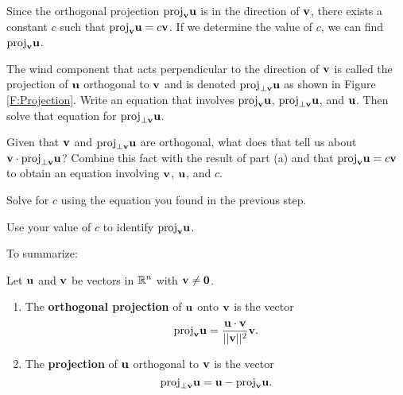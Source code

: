 \begin{activity} Since the orthogonal projection $\text{proj}_{\mathbf{v}} \mathbf{u}$ is in the direction of $\mathbf{v}$, there exists a constant $c$ such that $\text{proj}_{\mathbf{v}} \mathbf{u} = c \mathbf{v}$. If we determine the value of  $c$, we can find $\text{proj}_{\mathbf{v}} \mathbf{u}$.
\ba 
\item The wind component that acts perpendicular to the direction of $\mathbf{v}$ is called the projection of $\mathbf{u}$ orthogonal to $\mathbf{v}$ and is denoted $\text{proj}_{\perp \mathbf{v}} \mathbf{u}$ as shown in Figure \ref{F:Projection}. Write an equation that involves $\text{proj}_{\mathbf{v}} \mathbf{u}$, $\text{proj}_{\perp \mathbf{v}} \mathbf{u}$, and $\mathbf{u}$. Then solve that equation for $\text{proj}_{\perp \mathbf{v}} \mathbf{u}$. 

\item Given that $\mathbf{v}$ and $\text{proj}_{\perp \mathbf{v}} \mathbf{u}$ are orthogonal, what does that tell us about $\mathbf{v} \cdot \text{proj}_{\perp \mathbf{v}} \mathbf{u}$? Combine this fact with the result of part (a) and that $\text{proj}_{\mathbf{v}} \mathbf{u} = c \mathbf{v}$ to obtain an equation involving $\mathbf{v}$, $\mathbf{u}$, and $c$. 

\item Solve for $c$ using the equation you found in the previous step.

\item Use your value of $c$ to identify $\text{proj}_{\mathbf{v}} \mathbf{u}$. 
\ea
\end{activity}


To summarize:

\begin{definition} Let $\mathbf{u}$ and $\mathbf{v}$ be vectors in $\mathbb{R}^n$ with $\mathbf{v} \neq \mathbf{0}$. 
	\begin{enumerate}
	\item The \textbf{orthogonal projection} of $\mathbf{u}$ onto $\mathbf{v}$ is the vector 
	\begin{equation}  \label{eq:6_a_projection}
	\text{proj}_{\mathbf{v}} \mathbf{u} = \frac{\mathbf{u} \cdot \mathbf{v}}{||\mathbf{v}||^2} \mathbf{v}.
	\end{equation}
	\item The \textbf{projection} of $\mathbf{u}$ orthogonal to $\mathbf{v}$ is the vector 
	\[\text{proj}_{\perp \mathbf{v}} \mathbf{u} = \mathbf{u} - \text{proj}_{\mathbf{v}} \mathbf{u}.\]
	\end{enumerate}
\end{definition}



